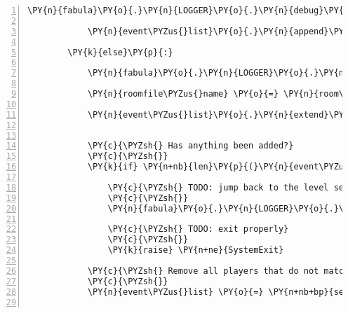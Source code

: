 \begin{Verbatim}[commandchars=\\\{\},numbers=left,firstnumber=1,stepnumber=1]
            \PY{n}{fabula}\PY{o}{.}\PY{n}{LOGGER}\PY{o}{.}\PY{n}{debug}\PY{p}{(}\PY{l+s}{\PYZdq{}}\PY{l+s}{Spawning }\PY{l+s}{\PYZsq{}}\PY{l+s}{\PYZob{}\PYZcb{}}\PY{l+s}{\PYZsq{}}\PY{l+s}{ at }\PY{l+s}{\PYZsq{}}\PY{l+s}{\PYZob{}\PYZcb{}}\PY{l+s}{\PYZsq{}}\PY{l+s}{\PYZdq{}}\PY{o}{.}\PY{n}{format}\PY{p}{(}\PY{n}{client\PYZus{}id}\PY{p}{,} \PY{n}{location}\PY{p}{)}\PY{p}{)}

            \PY{n}{event\PYZus{}list}\PY{o}{.}\PY{n}{append}\PY{p}{(}\PY{n}{fabula}\PY{o}{.}\PY{n}{SpawnEvent}\PY{p}{(}\PY{n}{entity}\PY{p}{,} \PY{n}{location}\PY{p}{)}\PY{p}{)}

        \PY{k}{else}\PY{p}{:}

            \PY{n}{fabula}\PY{o}{.}\PY{n}{LOGGER}\PY{o}{.}\PY{n}{debug}\PY{p}{(}\PY{l+s}{\PYZdq{}}\PY{l+s}{Room does not yet exist, attempting to load from file}\PY{l+s}{\PYZdq{}}\PY{p}{)}

            \PY{n}{roomfile\PYZus{}name} \PY{o}{=} \PY{n}{room\PYZus{}name} \PY{o}{+} \PY{l+s}{\PYZdq{}}\PY{l+s}{.floorplan}\PY{l+s}{\PYZdq{}}

            \PY{n}{event\PYZus{}list}\PY{o}{.}\PY{n}{extend}\PY{p}{(}\PY{n}{fabula}\PY{o}{.}\PY{n}{plugins}\PY{o}{.}\PY{n}{serverside}\PY{o}{.}\PY{n}{load\PYZus{}room\PYZus{}from\PYZus{}file}\PY{p}{(}\PY{n}{roomfile\PYZus{}name}\PY{p}{,}
                                                                            \PY{n}{complete}\PY{o}{=}\PY{n+nb+bp}{False}\PY{p}{)}\PY{p}{)}

            \PY{c}{\PYZsh{} Has anything been added?}
            \PY{c}{\PYZsh{}}
            \PY{k}{if} \PY{n+nb}{len}\PY{p}{(}\PY{n}{event\PYZus{}list}\PY{p}{)} \PY{o}{==} \PY{l+m+mi}{1}\PY{p}{:}

                \PY{c}{\PYZsh{} TODO: jump back to the level selection screen / room}
                \PY{c}{\PYZsh{}}
                \PY{n}{fabula}\PY{o}{.}\PY{n}{LOGGER}\PY{o}{.}\PY{n}{critical}\PY{p}{(}\PY{l+s}{\PYZdq{}}\PY{l+s}{error opening file }\PY{l+s}{\PYZsq{}}\PY{l+s}{\PYZob{}\PYZcb{}}\PY{l+s}{\PYZsq{}}\PY{l+s}{\PYZdq{}}\PY{o}{.}\PY{n}{format}\PY{p}{(}\PY{n}{roomfile\PYZus{}name}\PY{p}{)}\PY{p}{)}

                \PY{c}{\PYZsh{} TODO: exit properly}
                \PY{c}{\PYZsh{}}
                \PY{k}{raise} \PY{n+ne}{SystemExit}

            \PY{c}{\PYZsh{} Remove all players that do not match client id}
            \PY{c}{\PYZsh{}}
            \PY{n}{event\PYZus{}list} \PY{o}{=} \PY{n+nb+bp}{self}\PY{o}{.}\PY{n}{\PYZus{}filter\PYZus{}spawn\PYZus{}events}\PY{p}{(}\PY{n}{event\PYZus{}list}\PY{p}{,} \PY{n}{client\PYZus{}id}\PY{p}{)}


\end{Verbatim}
